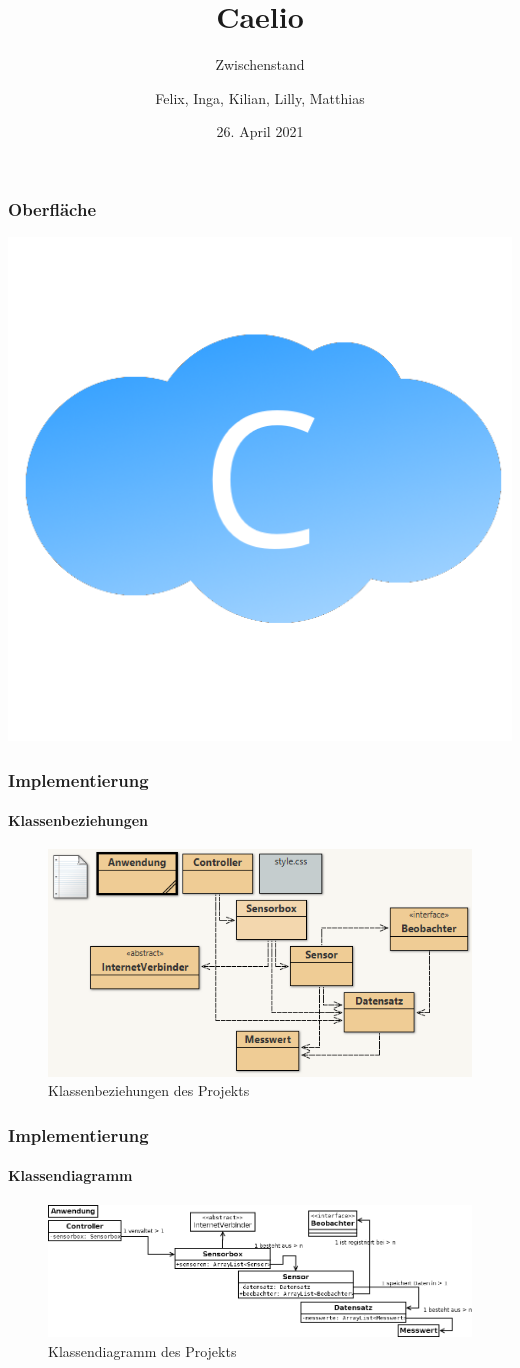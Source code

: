 \documentclass[notes]{beamer}
\title{Caelio}
\subtitle{Zwischenstand}
\author{Felix, Inga, Kilian, Lilly, Matthias}
\date{26. April 2021}
\begin{document}
	\begin{frame}
		\titlepage
	\end{frame}
	\begin{frame}
		\frametitle{Oberfläche}
		\thispagestyle{empty}
		\centering
		\includegraphics[height = .5\textheight]{../../Anwendung/Icons/caelio}
	\end{frame}
	\begin{frame}
		\frametitle{Implementierung}
		\framesubtitle{Klassenbeziehungen}
		\begin{figure}
			\centering
			\includegraphics[width = .75\textwidth]{Abbildungen/klassenbeziehungen}
			\caption{Klassenbeziehungen des Projekts}
		\end{figure}
	\end{frame}
	\begin{frame}
		\frametitle{Implementierung}
		\framesubtitle{Klassendiagramm}
		\begin{figure}
			\centering
			\includegraphics[width = \textwidth]{Abbildungen/klassendiagramm}
			\caption{Klassendiagramm des Projekts}
		\end{figure}
	\end{frame}
\end{document}
